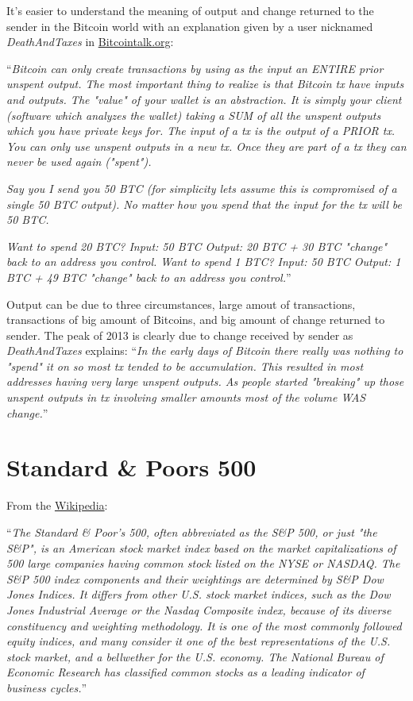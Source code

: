 It's easier to understand the meaning of output and change returned to
the sender in the Bitcoin world with an explanation given by a user
nicknamed \textit{DeathAndTaxes} in
\href{https://bitcointalk.org/index.php?topic=99593.0}{Bitcointalk.org}:

``\textit{Bitcoin can only create transactions by using as the input
  an ENTIRE prior unspent output. The most important thing to realize
  is that Bitcoin tx have inputs and outputs. The "value" of your
  wallet is an abstraction. It is simply your client (software which
  analyzes the wallet) taking a SUM of all the unspent outputs which
  you have private keys for. The input of a tx is the output of a
  PRIOR tx. You can only use unspent outputs in a new tx. Once they
  are part of a tx they can never be used again ("spent").}

\textit{Say you I send you 50 BTC (for simplicity lets assume this is
  compromised of a single 50 BTC output). No matter how you spend that
  the input for the tx will be 50 BTC.}

\textit{Want to spend 20 BTC? Input: 50 BTC Output: 20 BTC + 30 BTC
  "change" back to an address you control. Want to spend 1 BTC? Input:
  50 BTC Output: 1 BTC + 49 BTC "change" back to an address you
  control.}''

Output can be due to three circumstances, large amout of transactions,
transactions of big amount of Bitcoins, and big amount of change
returned to sender. The peak of 2013 is clearly due to change received
by sender as \textit{DeathAndTaxes} explains: ``\textit{In the early
  days of Bitcoin there really was nothing to "spend" it on so most tx
  tended to be accumulation. This resulted in most addresses having
  very large unspent outputs. As people started "breaking" up those
  unspent outputs in tx involving smaller amounts most of the volume
  WAS change.}''


\section{Standard \& Poors 500}
\label{sec:standard-and-poors-500}


From the
\href{https://en.wikipedia.org/wiki/S\%26P_500_Index}{Wikipedia}:

``\textit{The Standard \& Poor's 500, often abbreviated as the S\&P
  500, or just "the S\&P", is an American stock market index based on
  the market capitalizations of 500 large companies having common
  stock listed on the NYSE or NASDAQ. The S\&P 500 index components
  and their weightings are determined by S\&P Dow Jones Indices. It
  differs from other U.S. stock market indices, such as the Dow Jones
  Industrial Average or the Nasdaq Composite index, because of its
  diverse constituency and weighting methodology. It is one of the
  most commonly followed equity indices, and many consider it one of
  the best representations of the U.S. stock market, and a bellwether
  for the U.S. economy. The National Bureau of Economic Research has
  classified common stocks as a leading indicator of business
  cycles.}''

